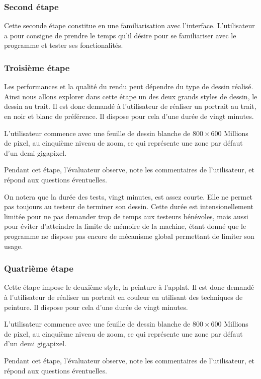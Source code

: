 			\subsubsection{Second étape}
			Cette seconde étape constitue en une familiarisation avec l'interface. L'utilisateur
			a pour consigne de prendre le temps qu'il désire pour se familiariser avec le programme
			et tester ses fonctionalités. 

			\subsubsection{Troisième étape}
			Les performances et la qualité du rendu peut dépendre du type de dessin réalisé. Ainsi
			nous allons explorer dans cette étape un des deux grands styles de dessin, le dessin au trait.
			Il est donc demandé à l'utilisateur de réaliser un portrait au trait, en noir et blanc de préférence.
			Il dispose pour cela d'une durée de vingt minutes. 


			L'utilisateur commence avec une feuille de dessin blanche de $800 \times 600$ Millions de pixel, au cinquième
			niveau de zoom, ce qui représente une zone par défaut d'un demi gigapixel. 

			Pendant cet étape, l'évaluateur observe, note les commentaires de l'utilisateur, et répond aux questions
			éventuelles. 

			On notera que la durée des tests, vingt minutes, est assez courte. Elle ne permet pas toujours au testeur
			de terminer son dessin. Cette durée est intensionellement limitée pour ne pas demander trop de temps aux testeurs
			bénévoles, mais aussi pour éviter d'atteindre la limite de mémoire de la machine, étant donné que 
			le programme ne dispose pas encore de mécanisme global permettant de limiter son usage. 

			\subsubsection{Quatrième étape}
			Cette étape impose le deuxième style, la peinture à l'applat. Il est donc demandé à l'utilisateur de
			réaliser un portrait en couleur en utilisant des techniques de peinture. 
			Il dispose pour cela d'une durée de vingt minutes. 

			L'utilisateur commence avec une feuille de dessin blanche de $800 \times 600$ Millions de pixel, au cinquième
			niveau de zoom, ce qui représente une zone par défaut d'un demi gigapixel. 

			Pendant cet étape, l'évaluateur observe, note les commentaires de l'utilisateur, et répond aux questions
			éventuelles. 

